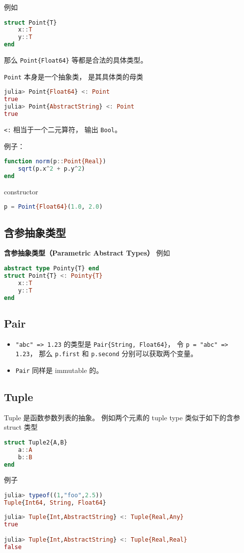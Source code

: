 例如
\begin{lstlisting}[language=julia]
struct Point{T}
    x::T
    y::T
end
\end{lstlisting}
那么 \verb|Point{Float64}| 等都是合法的具体类型。

\verb|Point| 本身是一个抽象类， 是其具体类的母类
\begin{lstlisting}[language=julia]
julia> Point{Float64} <: Point
true
julia> Point{AbstractString} <: Point
true
\end{lstlisting}
\verb|<:| 相当于一个二元算符， 输出 \verb|Bool|。

例子：
\begin{lstlisting}[language=julia]
function norm(p::Point{Real})
    sqrt(p.x^2 + p.y^2)
end
\end{lstlisting}
constructor
\begin{lstlisting}[language=julia]
p = Point{Float64}(1.0, 2.0)
\end{lstlisting}

\subsection{含参抽象类型}
\textbf{含参抽象类型（Parametric Abstract Types）}
例如
\begin{lstlisting}[language=julia]
abstract type Pointy{T} end
struct Point{T} <: Pointy{T}
    x::T
    y::T
end
\end{lstlisting}

\subsection{Pair}
\begin{itemize}
\item \verb|"abc" => 1.23| 的类型是 \verb|Pair{String, Float64}|， 令 \verb|p = "abc" => 1.23|， 那么 \verb|p.first| 和 \verb|p.second| 分别可以获取两个变量。
\item \verb|Pair| 同样是 immutable 的。
\end{itemize}


\subsection{Tuple}
Tuple 是函数参数列表的抽象。 例如两个元素的 tuple type 类似于如下的含参 struct 类型
\begin{lstlisting}[language=julia]
struct Tuple2{A,B}
    a::A
    b::B
end
\end{lstlisting}
例子
\begin{lstlisting}[language=julia]
julia> typeof((1,"foo",2.5))
Tuple{Int64, String, Float64}
\end{lstlisting}
\begin{lstlisting}[language=julia]
julia> Tuple{Int,AbstractString} <: Tuple{Real,Any}
true

julia> Tuple{Int,AbstractString} <: Tuple{Real,Real}
false
\end{lstlisting}

